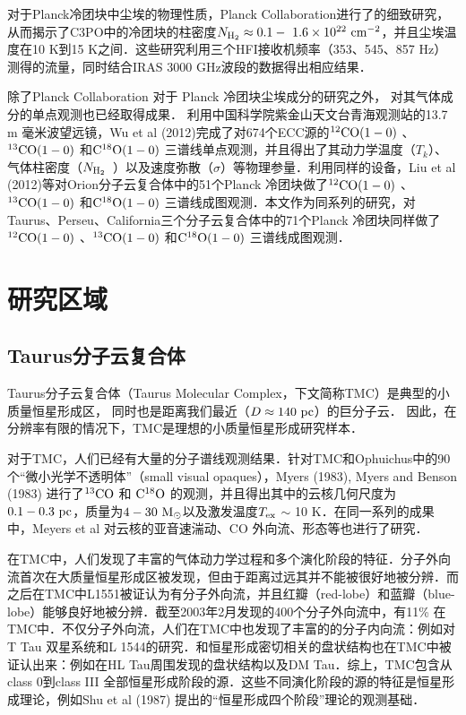 \documentclass[UTF8, nocolorlinks]{pkuthss}
\newcommand{\cob}{$\rm ^{13}CO$ }
\newcommand{\coc}{$\rm C^{18}O$ }
\newcommand{\coaa}{$\rm^{12}CO(1-0)$ }
\newcommand{\cobb}{$\rm^{13}CO(1-0)$ }
\newcommand{\cocc}{$\rm C^{18}O(1-0)$ }
\newcommand{\texc}{$T_{\rm {ex}}$ }
\newcommand{\nhyd}{$N_{\rm H_2}$\ }
\begin{document}
		对于Planck冷团块中尘埃的物理性质，Planck Collaboration进行了的细致研究，从而揭示了C3PO中的冷团块的柱密度$N_ {\rm H_2} \approx 0.1 \rm - \ 1.6 \times 10^{22} \rm\ cm^{-2}$，并且尘埃温度在10 K到15 K之间\supercite{2011A&A...536A..23P}．这些研究利用三个HFI接收机频率（353、545、857 Hz）测得的流量，同时结合IRAS 3000 GHz波段的数据得出相应结果\supercite{2011A&A...536A..23P,2011A&A...536A..22P}．

		除了Planck Collaboration 对于 Planck 冷团块尘埃成分的研究之外， 对其气体成分的单点观测也已经取得成果． 利用中国科学院紫金山天文台青海观测站的13.7 m 毫米波望远镜，Wu et al (2012)完成了对674个ECC源的\coaa 、\cobb  和\cocc  三谱线单点观测，并且得出了其动力学温度（$T_k$）、气体柱密度（\nhyd）以及速度弥散（$\sigma$）等物理参量\supercite{wu2012gas}．利用同样的设备，Liu et al (2012)等对Orion分子云复合体中的51个Planck 冷团块做了\coaa 、\cobb  和\cocc  三谱线成图观测\supercite{LiuTie}．本文作为同系列的研究，对Taurus、Perseu、California三个分子云复合体中的71个Planck 冷团块同样做了\coaa 、\cobb  和\cocc  三谱线成图观测．

	\section{研究区域}\label{Sec.TPC}

		\subsection{Taurus分子云复合体}

			Taurus分子云复合体（Taurus Molecular Complex，下文简称TMC）是典型的小质量恒星形成区， 同时也是距离我们最近（$D\approx 140\rm\ pc$）的巨分子云\supercite{1987ApJ...322..706D}． 因此，在分辨率有限的情况下，TMC是理想的小质量恒星形成研究样本．

			对于TMC，人们已经有大量的分子谱线观测结果．针对TMC和Ophuichus中的90个“微小光学不透明体”（small visual opaques），Myers (1983), Myers and Benson (1983) 进行了\cob 和 \coc 的观测，并且得出其中的云核几何尺度为$0.1-0.3 \ \rm pc$，质量为$4-30\ \rm M_\odot$以及激发温度\texc $\sim$ 10 K\supercite{1983ApJ...264..517M,1983ApJ...266..309M}．在同一系列的成果中，Meyers et al 对云核的亚音速湍动、CO 外向流、形态等也进行了研究\supercite{1983ApJ...270..105M,1988ApJ...324..907M,1991ApJ...376..561M}．

			在TMC中，人们发现了丰富的气体动力学过程和多个演化阶段的特征．分子外向流首次在大质量恒星形成区被发现，但由于距离过远其并不能被很好地被分辨\supercite{1976ApJ...209L.137Z}．而之后在TMC中L1551被证认为有分子外向流，并且红瓣（red-lobe）和蓝瓣（blue-lobe）能够良好地被分辨\supercite{1980ApJ...239L..17S}．截至2003年2月发现的400个分子外向流中，有11\% 在TMC中\supercite{2004A&A...426..503W}．不仅分子外向流，人们在TMC中也发现了丰富的的分子内向流：例如对T Tau 双星系统\supercite{1994ApJ...425L..45V}和L 1544的研究\supercite{1998ApJ...504..900T}．和恒星形成密切相关的盘状结构也在TMC中被证认出来：例如在HL Tau周围发现的盘状结构\supercite{1991ApJ...382L..31S}以及DM Tau\supercite{1995ApJ...453..384S}．综上，TMC包含从class 0到class III 全部恒星形成阶段的源．这些不同演化阶段的源的特征是恒星形成理论，例如Shu et al (1987) 提出的“恒星形成四个阶段”理论\supercite{shu1987star}的观测基础．
\end{document}

